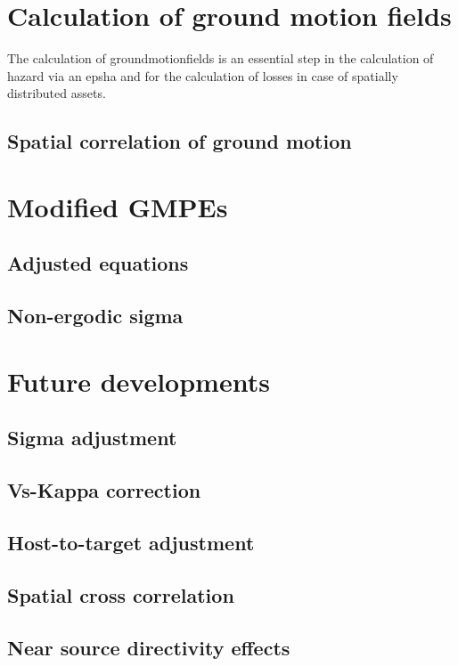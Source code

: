 \section{Calculation of ground motion fields}
%
The calculation of \glspl{groundmotionfield} is an essential step in the
calculation of hazard via an \gls{epsha} and for the calculation of losses 
in case of spatially distributed assets.
\subsection{Spatial correlation of ground motion}
%
\section{Modified GMPEs}
%
\subsection{Adjusted equations}
%
\subsection{Non-ergodic sigma}
%
\section{Future developments}
%
\subsection{Sigma adjustment}
%
\subsection{Vs-Kappa correction}
%
\subsection{Host-to-target adjustment}
%
\subsection{Spatial cross correlation}
%
\subsection{Near source directivity effects}
